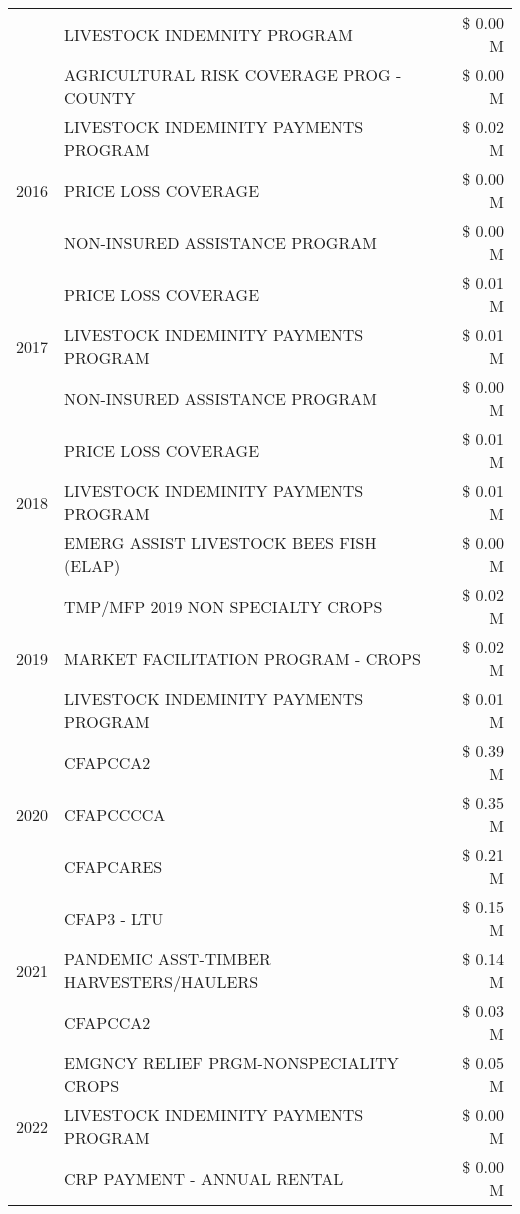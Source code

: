 \begin{tabular}{llr}
 & LIVESTOCK INDEMNITY PROGRAM & \$ 0.00 M \\
 & AGRICULTURAL RISK COVERAGE PROG - COUNTY & \$ 0.00 M \\
\cline{1-3}
\multirow[t]{3}{*}{2016} & LIVESTOCK INDEMINITY PAYMENTS PROGRAM & \$ 0.02 M \\
 & PRICE LOSS COVERAGE & \$ 0.00 M \\
 & NON-INSURED ASSISTANCE PROGRAM & \$ 0.00 M \\
\cline{1-3}
\multirow[t]{3}{*}{2017} & PRICE LOSS COVERAGE & \$ 0.01 M \\
 & LIVESTOCK INDEMINITY PAYMENTS PROGRAM & \$ 0.01 M \\
 & NON-INSURED ASSISTANCE PROGRAM & \$ 0.00 M \\
\cline{1-3}
\multirow[t]{3}{*}{2018} & PRICE LOSS COVERAGE & \$ 0.01 M \\
 & LIVESTOCK INDEMINITY PAYMENTS PROGRAM & \$ 0.01 M \\
 & EMERG ASSIST LIVESTOCK BEES FISH (ELAP) & \$ 0.00 M \\
\cline{1-3}
\multirow[t]{3}{*}{2019} & TMP/MFP 2019 NON SPECIALTY CROPS & \$ 0.02 M \\
 & MARKET FACILITATION PROGRAM - CROPS & \$ 0.02 M \\
 & LIVESTOCK INDEMINITY PAYMENTS PROGRAM & \$ 0.01 M \\
\cline{1-3}
\multirow[t]{3}{*}{2020} & CFAPCCA2 & \$ 0.39 M \\
 & CFAPCCCCA & \$ 0.35 M \\
 & CFAPCARES & \$ 0.21 M \\
\cline{1-3}
\multirow[t]{3}{*}{2021} & CFAP3 - LTU & \$ 0.15 M \\
 & PANDEMIC ASST-TIMBER HARVESTERS/HAULERS & \$ 0.14 M \\
 & CFAPCCA2 & \$ 0.03 M \\
\cline{1-3}
\multirow[t]{3}{*}{2022} & EMGNCY RELIEF PRGM-NONSPECIALITY CROPS & \$ 0.05 M \\
 & LIVESTOCK INDEMINITY PAYMENTS PROGRAM & \$ 0.00 M \\
 & CRP PAYMENT - ANNUAL RENTAL & \$ 0.00 M \\
\cline{1-3}
\bottomrule
\end{tabular}
